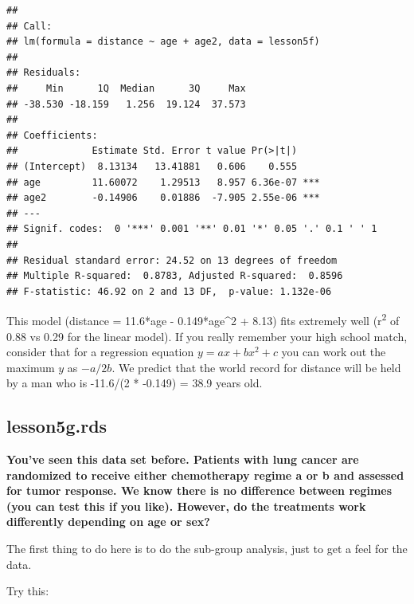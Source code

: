 \documentclass[]{book}
\newenvironment{Shaded}{\begin{snugshade}}{\end{snugshade}}
\newcommand{\CommentTok}[1]{\textcolor[rgb]{0.56,0.35,0.01}{\textit{#1}}}
\newcommand{\DataTypeTok}[1]{\textcolor[rgb]{0.13,0.29,0.53}{#1}}
\newcommand{\DecValTok}[1]{\textcolor[rgb]{0.00,0.00,0.81}{#1}}
\newcommand{\KeywordTok}[1]{\textcolor[rgb]{0.13,0.29,0.53}{\textbf{#1}}}
\newcommand{\NormalTok}[1]{#1}
\newcommand{\OperatorTok}[1]{\textcolor[rgb]{0.81,0.36,0.00}{\textbf{#1}}}
\newcommand{\StringTok}[1]{\textcolor[rgb]{0.31,0.60,0.02}{#1}}
\begin{document}
\begin{verbatim}
## 
## Call:
## lm(formula = distance ~ age + age2, data = lesson5f)
## 
## Residuals:
##     Min      1Q  Median      3Q     Max 
## -38.530 -18.159   1.256  19.124  37.573 
## 
## Coefficients:
##             Estimate Std. Error t value Pr(>|t|)    
## (Intercept)  8.13134   13.41881   0.606    0.555    
## age         11.60072    1.29513   8.957 6.36e-07 ***
## age2        -0.14906    0.01886  -7.905 2.55e-06 ***
## ---
## Signif. codes:  0 '***' 0.001 '**' 0.01 '*' 0.05 '.' 0.1 ' ' 1
## 
## Residual standard error: 24.52 on 13 degrees of freedom
## Multiple R-squared:  0.8783, Adjusted R-squared:  0.8596 
## F-statistic: 46.92 on 2 and 13 DF,  p-value: 1.132e-06
\end{verbatim}

This model (distance = 11.6*age - 0.149*age\^{}2 + 8.13) fits extremely
well (r\textsuperscript{2} of 0.88 vs 0.29 for the linear model). If you
really remember your high school match, consider that for a regression
equation \(y = ax + bx^2 + c\) you can work out the maximum \(y\) as
\(-a/2b\). We predict that the world record for distance will be held by
a man who is -11.6/(2 * -0.149) = 38.9 years old.

\hypertarget{lesson5g.rds}{%
\subsection{lesson5g.rds}\label{lesson5g.rds}}

\textbf{You've seen this data set before. Patients with lung cancer are
randomized to receive either chemotherapy regime a or b and assessed for
tumor response. We know there is no difference between regimes (you can
test this if you like). However, do the treatments work differently
depending on age or sex?}

The first thing to do here is to do the sub-group analysis, just to get
a feel for the data.

Try this:

\begin{Shaded}
\end{Shaded}
\end{document}
